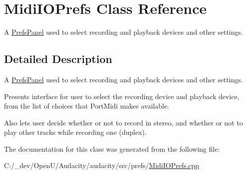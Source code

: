 \hypertarget{class_midi_i_o_prefs}{}\section{Midi\+I\+O\+Prefs Class Reference}
\label{class_midi_i_o_prefs}


A \hyperlink{class_prefs_panel}{Prefs\+Panel} used to select recording and playback devices and other settings.  




\subsection{Detailed Description}
A \hyperlink{class_prefs_panel}{Prefs\+Panel} used to select recording and playback devices and other settings. 

Presents interface for user to select the recording device and playback device, from the list of choices that Port\+Midi makes available.

Also lets user decide whether or not to record in stereo, and whether or not to play other tracks while recording one (duplex). 

The documentation for this class was generated from the following file\+:\begin{DoxyCompactItemize}
\item 
C\+:/\+\_\+dev/\+Open\+U/\+Audacity/audacity/src/prefs/\hyperlink{_midi_i_o_prefs_8cpp}{Midi\+I\+O\+Prefs.\+cpp}\end{DoxyCompactItemize}
